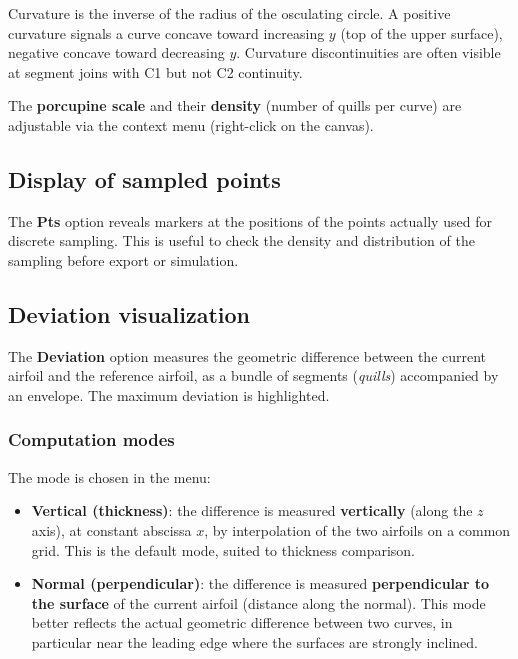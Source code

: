 
\begin{noteinfo}
Curvature is the inverse of the radius of the osculating circle.
A positive curvature signals a curve concave toward increasing
$y$ (top of the upper surface), negative concave toward decreasing
$y$. Curvature discontinuities are often visible at segment joins
with C1 but not C2 continuity.
\end{noteinfo}

The \textbf{porcupine scale} and their \textbf{density} (number of
quills per curve) are adjustable via the context menu (right-click
on the canvas).

\subsection{Display of sampled points}

The \textbf{Pts} option reveals markers at the positions of the
points actually used for discrete sampling. This is useful to check
the density and distribution of the sampling before export or
simulation.


\subsection{Deviation visualization}
\label{sec:deviation}

The \textbf{Deviation} option measures the geometric difference
between the current airfoil and the reference airfoil, as a bundle
of segments (\emph{quills}) accompanied by an envelope. The maximum
deviation is highlighted.

\subsubsection*{Computation modes}

The mode is chosen in the 
menu:

\begin{itemize}
    \item \textbf{Vertical (thickness)}: the difference is measured
        \textbf{vertically} (along the $z$ axis), at constant
        abscissa $x$, by interpolation of the two airfoils on a
        common grid. This is the default mode, suited to thickness
        comparison.
    \item \textbf{Normal (perpendicular)}: the difference is measured
        \textbf{perpendicular to the surface} of the current airfoil
        (distance along the normal). This mode better reflects the
        actual geometric difference between two curves, in particular
        near the leading edge where the surfaces are strongly
        inclined.
\end{itemize}

